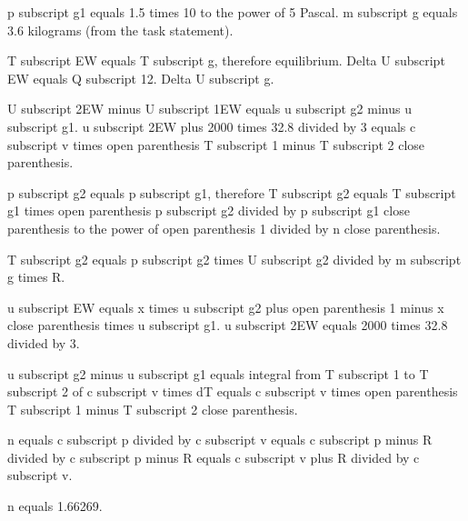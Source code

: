p subscript g1 equals 1.5 times 10 to the power of 5 Pascal.  
m subscript g equals 3.6 kilograms (from the task statement).  

T subscript EW equals T subscript g, therefore equilibrium.  
Delta U subscript EW equals Q subscript 12.  
Delta U subscript g.  

U subscript 2EW minus U subscript 1EW equals u subscript g2 minus u subscript g1.  
u subscript 2EW plus 2000 times 32.8 divided by 3 equals c subscript v times open parenthesis T subscript 1 minus T subscript 2 close parenthesis.  

p subscript g2 equals p subscript g1, therefore T subscript g2 equals T subscript g1 times open parenthesis p subscript g2 divided by p subscript g1 close parenthesis to the power of open parenthesis 1 divided by n close parenthesis.  

T subscript g2 equals p subscript g2 times U subscript g2 divided by m subscript g times R.  

u subscript EW equals x times u subscript g2 plus open parenthesis 1 minus x close parenthesis times u subscript g1.  
u subscript 2EW equals 2000 times 32.8 divided by 3.  

u subscript g2 minus u subscript g1 equals integral from T subscript 1 to T subscript 2 of c subscript v times dT equals c subscript v times open parenthesis T subscript 1 minus T subscript 2 close parenthesis.  

n equals c subscript p divided by c subscript v equals c subscript p minus R divided by c subscript p minus R equals c subscript v plus R divided by c subscript v.  

n equals 1.66269.